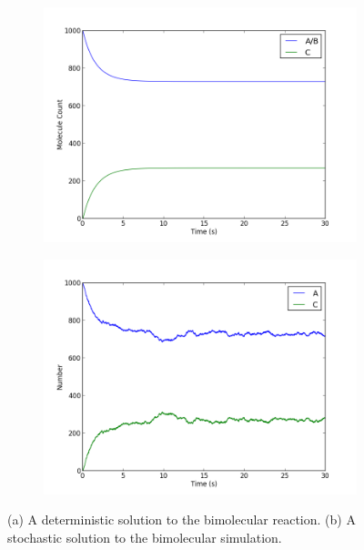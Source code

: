 \begin{figure}[h!]
  \centering
        \begin{subfigure}[b]{0.49\textwidth}
                \includegraphics[width=\textwidth]{Figures/BimolecularODE.png}
        \end{subfigure}
        \begin{subfigure}[b]{0.49\textwidth}
                \includegraphics[width=\textwidth]{Figures/BimolecularStoch.png}
        \end{subfigure}
        \caption{(a) A deterministic solution to the bimolecular reaction. (b) A stochastic solution to the bimolecular simulation.} \label{fig:tut11}
\end{figure}

